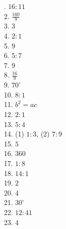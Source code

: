 \documentclass{article}
\begin{document}
. \(16:11\)\\
2. \(\frac{160}{9}\)\\
3. \(3\)\\
4. \(2:1\)\\
5. \(9\)\\
6. \(5:7\)\\
7. \(9\)\\
8. \(\frac{16}9\)\\
9. \(70^\circ\)\\
10. \(8:1\)\\
11. \(b^2=ac\)\\
12. \(2:1\)\\
13. \(5:4\)\\
14. (1) \(1:3\), (2) \(7:9\)\\
15. \(5\)\\
16. \(360\)\\
17. \(1:8\)\\
18. \(14:1\)\\
19. \(2\)\\
20. \(4\)\\
21. \(30^\circ\)\\
22. \(12:41\)\\
23. \(4\)
\end{document}
